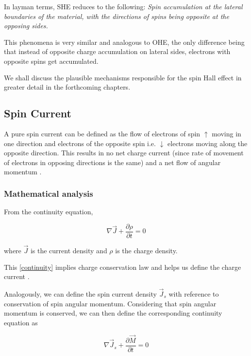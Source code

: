 In layman terms, SHE reduces to the following: \textit{Spin accumulation at the lateral boundaries of the material, with the directions of spins being opposite at the opposing sides.}

This phenomena is very similar and analogous to OHE, the only difference being that instead of opposite charge accumulation on lateral sides, electrons with opposite spins get accumulated.

We shall discuss the plausible mechanisms responsible for the spin Hall effect in greater detail in the forthcoming chapters.

\subsection{Spin Current}

A pure spin current can be defined as the flow of electrons of spin $ \uparrow $ moving in one direction and electrons of the opposite spin i.e. $ \downarrow $ electrons moving along the opposite direction.
This results in no net charge current (since rate of movement of electrons in opposing directions is the same) and a net flow of angular momentum \cite{krishnan2016fundamentals}.

\subsubsection{Mathematical analysis}

From the continuity equation,

\begin{equation} \label{continuity}
    \nabla \vec{J} + \frac{\partial \rho}{\partial t} = 0
\end{equation}

where $ \vec{J} $ is the current density and $ \rho $ is the charge density.

This \cref{continuity} implies charge conservation law and helps us define the charge current \cite{jackson1999classical}.

Analogously, we can define the spin current density $ \vec{J}_s $ with reference to conservation of spin angular momentum. Considering that spin angular momentum is conserved, we can then define the corresponding continuity equation as

\begin{equation} \label{spin-current-density}
    \nabla \vec{J}_s + \frac{\partial \vec{M}}{\partial t} = 0
\end{equation}

